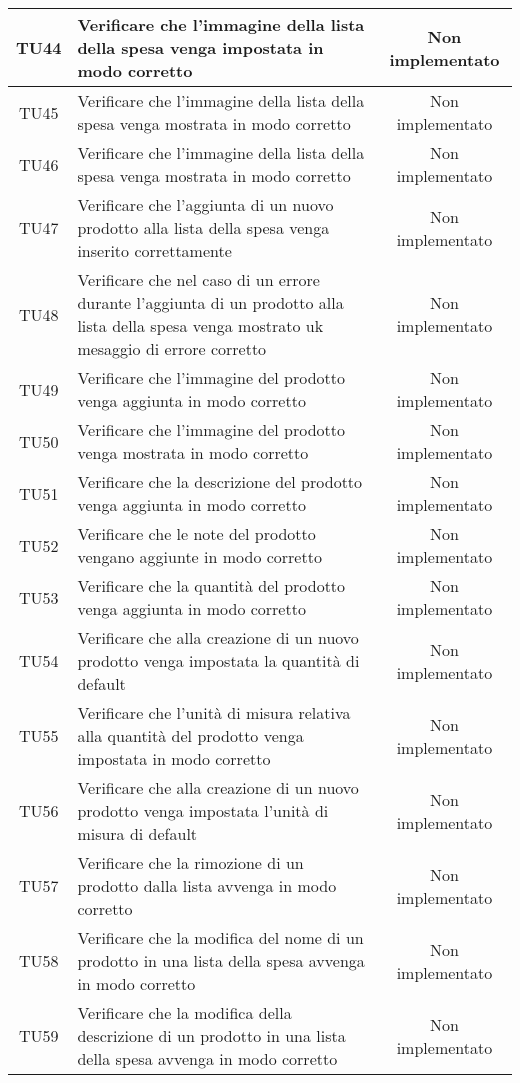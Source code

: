\begin{center}
\begin{longtable}{|c|>{\centering}m{10cm}|c|}
		TU44 & Verificare che l'immagine della lista della spesa venga impostata in modo corretto & Non implementato \\ \hline
		TU45 & Verificare che l'immagine della lista della spesa venga mostrata in modo corretto & Non implementato \\ \hline
		TU46 & Verificare che l'immagine della lista della spesa venga mostrata in modo corretto & Non implementato \\ \hline
		TU47 & Verificare che l'aggiunta di un nuovo prodotto alla lista della spesa venga inserito correttamente & Non implementato \\ \hline
		TU48 & Verificare che nel caso di un errore durante l'aggiunta di un prodotto alla lista della spesa venga mostrato uk mesaggio di errore corretto & Non implementato \\ \hline
		TU49 & Verificare che l'immagine del prodotto venga aggiunta in modo corretto & Non implementato \\ \hline
		TU50 & Verificare che l'immagine del prodotto venga mostrata in modo corretto & Non implementato \\ \hline
		TU51 & Verificare che la descrizione del prodotto venga aggiunta in modo corretto & Non implementato \\ \hline
		TU52 & Verificare che le note del prodotto vengano aggiunte in modo corretto & Non implementato \\ \hline
		TU53 & Verificare che la quantità del prodotto venga aggiunta in modo corretto & Non implementato \\ \hline
		TU54 & Verificare che alla creazione di un nuovo prodotto venga impostata la quantità di default & Non implementato \\ \hline
		TU55 & Verificare che l'unità di misura relativa alla quantità del prodotto venga impostata in modo corretto & Non implementato \\ \hline
		TU56 & Verificare che alla creazione di un nuovo prodotto venga impostata l'unità di misura di default & Non implementato \\ \hline
		TU57 & Verificare che la rimozione di un prodotto dalla lista avvenga in modo corretto & Non implementato \\ \hline
		TU58 & Verificare che la modifica del nome di un prodotto in una lista della spesa avvenga in modo corretto & Non implementato \\ \hline
		TU59 & Verificare che la modifica della descrizione di un prodotto in una lista della spesa avvenga in modo corretto & Non implementato \\ \hline

\end{longtable}
\end{center}
